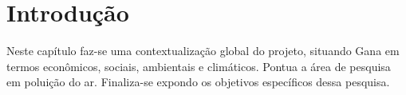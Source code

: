 \chapter{Introdução}


Neste capítulo faz-se uma contextualização global do projeto, 
situando Gana em termos econômicos, sociais, ambientais e climáticos.
Pontua a área de pesquisa em poluição do ar.
Finaliza-se expondo os objetivos específicos dessa pesquisa. 





